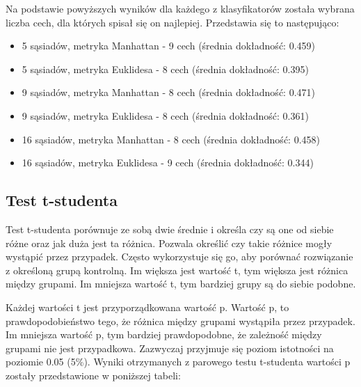 \documentclass[runningheads]{llncs}
\begin{document}
Na podstawie powyższych wyników dla każdego z klasyfikatorów została wybrana liczba cech, dla których spisał się on najlepiej. Przedstawia się to następująco:
\begin{itemize}
    \item 5 sąsiadów, metryka Manhattan - 9 cech (średnia dokładność: 0.459)
    \item 5 sąsiadów, metryka Euklidesa - 8 cech (średnia dokładność: 0.395)
    \item 9 sąsiadów, metryka Manhattan - 8 cech (średnia dokładność: 0.471)
    \item 9 sąsiadów, metryka Euklidesa - 8 cech (średnia dokładność: 0.361)
    \item 16 sąsiadów, metryka Manhattan - 8 cech (średnia dokładność: 0.458)
    \item 16 sąsiadów, metryka Euklidesa - 9 cech (średnia dokładność: 0.344)
\end{itemize}
\subsection{Test t-studenta}

Test t-studenta \cite{tstud} porównuje ze sobą dwie średnie i określa czy są one od siebie różne oraz jak duża jest ta różnica. Pozwala określić czy takie różnice mogły wystąpić przez przypadek. Często wykorzystuje się go, aby porównać rozwiązanie z określoną grupą kontrolną. Im większa jest wartość t, tym większa jest różnica między grupami. Im mniejsza wartość t, tym bardziej grupy są do siebie podobne.

Każdej wartości t jest przyporządkowana wartość p. Wartość p, to prawdopodobieństwo tego, że różnica między grupami wystąpiła przez przypadek. Im mniejsza wartość p, tym bardziej prawdopodobne, że zależność między grupami nie jest przypadkowa. Zazwyczaj przyjmuje się poziom istotności na poziomie 0.05 (5\%). Wyniki otrzymanych z parowego testu t-studenta wartości p zostały przedstawione w poniższej tabeli:
\end{document}
